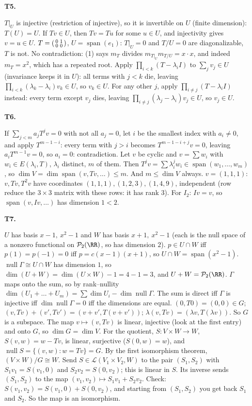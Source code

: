 \documentclass[10pt]{scrartcl}
\DeclareMathOperator{\nul}{null}
\DeclareMathOperator{\spn}{span}
\newcommand{\LL}{\mathcal L}
\newcommand{\PP}{\mathcal P}
\begin{document}
\textbf{T5.}
\begin{enumerate}[(a)]
  \ii $T|_U$ is injective (restriction of injective), so it is invertible on $U$ (finite dimension): $T(U)=U$. If $Tv\in U$, then $Tv=Tu$ for some $u\in U$, and injectivity gives $v=u\in U$.
  \ii $T=\begin{psmallmatrix}0&1\\0&0\end{psmallmatrix}$, $U=\spn(e_1)$: $T|_U=0$ and $T/U=0$ are diagonalizable, $T$ is not. No contradiction: (1) says $m_T$ divides $m_{T|_U}m_{T/U}=x\cdot x$, and indeed $m_T=x^2$, which has a repeated root.
  \ii Apply $\prod_{i<k}(T-\lambda_iI)$ to $\sum_j v_j\in U$ (invariance keeps it in $U$): all terms with $j<k$ die, leaving $\prod_{i<k}(\lambda_k-\lambda_i)v_k\in U$, so $v_k\in U$. For any other $j$, apply $\prod_{i\ne j}(T-\lambda_iI)$ instead: every term except $v_j$ dies, leaving $\prod_{i\ne j}(\lambda_j-\lambda_i)v_j\in U$, so $v_j\in U$.
\end{enumerate}

\textbf{T6.}
\begin{enumerate}[(a)]
  \ii If $\sum_{j<m}a_jT^jv=0$ with not all $a_j=0$, let $i$ be the smallest index with $a_i\ne0$, and apply $T^{m-1-i}$: every term with $j>i$ becomes $T^{m-1-i+j}v=0$, leaving $a_iT^{m-1}v=0$, so $a_i=0$: contradiction.
  \ii Let $v$ be cyclic and $v=\sum w_i$ with $w_i\in E(\lambda_i,T)$, $\lambda_i$ distinct, $m$ of them. Then $T^jv=\sum\lambda_i^jw_i\in\spn(w_1,\dots,w_m)$, so $\dim V=\dim\spn(v,Tv,\dots)\le m$. And $m\le\dim V$ always.
  \ii $v=(1,1,1)$: $v,Tv,T^2v$ have coordinates $(1,1,1),(1,2,3),(1,4,9)$, independent (row reduce the $3\times3$ matrix with these rows: it has rank $3$). For $I_2$: $Iv=v$, so $\spn(v,Iv,\dots)$ has dimension $1<2$.
\end{enumerate}

\textbf{T7.}
\begin{enumerate}[(a)]
  \ii $U$ has basis $x-1,\ x^2-1$ and $W$ has basis $x+1,\ x^2-1$ (each is the null space of a nonzero functional on $\PP_2(\RR)$, so has dimension $2$). $p\in U\cap W$ iff $p(1)=p(-1)=0$ iff $p=c(x-1)(x+1)$, so $U\cap W=\spn(x^2-1)$. $\nul\Gamma\cong U\cap W$ has dimension $1$, so $\dim(U+W)=\dim(U\times W)-1=4-1=3$, and $U+W=\PP_2(\RR)$.
  \ii $\Gamma$ maps onto the sum, so by rank--nullity $\dim(U_1+\dots+U_m)=\sum\dim U_i-\dim\nul\Gamma$. The sum is direct iff $\Gamma$ is injective iff $\dim\nul\Gamma=0$ iff the dimensions are equal.
  \ii $(0,T0)=(0,0)\in G$; $(v,Tv)+(v',Tv')=(v+v',T(v+v'))$; $\lambda(v,Tv)=(\lambda v,T(\lambda v))$. So $G$ is a subspace. The map $v\mapsto(v,Tv)$ is linear, injective (look at the first entry) and onto $G$, so $\dim G=\dim V$. For the quotient, $S\colon V\times W\to W$, $S(v,w)=w-Tv$, is linear, surjective ($S(0,w)=w$), and $\nul S=\{(v,w):w=Tv\}=G$. By the first isomorphism theorem, $(V\times W)/G\cong W$.
  \ii Send $S\in\LL(V_1\times V_2,W)$ to the pair $(S_1,S_2)$ with $S_1v_1=S(v_1,0)$ and $S_2v_2=S(0,v_2)$; this is linear in $S$. Its inverse sends $(S_1,S_2)$ to the map $(v_1,v_2)\mapsto S_1v_1+S_2v_2$. Check: $S(v_1,v_2)=S(v_1,0)+S(0,v_2)$, and starting from $(S_1,S_2)$ you get back $S_1$ and $S_2$. So the map is an isomorphism.
\end{enumerate}
\end{document}
